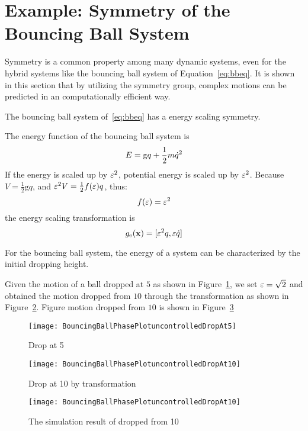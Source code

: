 \section{Example: Symmetry of the Bouncing Ball System}
\label{sec:symball}
Symmetry is a common property among many dynamic systems, even for the hybrid systems like the bouncing ball system of Equation~\ref{eq:bbeq}.
It is shown in this section that by utilizing the symmetry group, complex motions can be predicted in an computationally efficient way.

The bouncing ball system of~\ref{eq:bbeq} has a energy scaling symmetry.

The energy function of the bouncing ball system is  
\[
E=\mathrm{g}q+\frac{1}{2}m\dot{q}^2
\]
If the energy is scaled up by $\varepsilon^2$,  potential energy is scaled up by $\varepsilon^2$.
 Because $V= \frac{1}{2}\mathrm{g}q$, and $\varepsilon^2 V=\frac{1}{2}f(\varepsilon)q$, thus:
\[
f(\varepsilon)=\varepsilon^2
\]
the energy scaling transformation is
\[
g_{\mathrm{e}}(\mathbf{x})=[\varepsilon^2 q, \varepsilon \dot{q}]
\]

For the bouncing ball system, the energy of a system can be characterized by the initial dropping height.

Given the motion of a ball dropped at $5$ as shown in Figure~\ref{fig:bouncing5}, we set $\varepsilon=\sqrt{2}$ and obtained the motion dropped from $10$ through the transformation as shown in Figure~\ref{fig:bouncing10}.
Figure  motion dropped from $10$ is shown in Figure~\ref{fig:bouncing10sim}
\begin{figure}[!htbp]
  \begin{center}
      \texttt{[image: BouncingBallPhasePlotuncontrolledDropAt5]}
    \caption{Drop at 5}
    \label{fig:bouncing5}
\end{center}
\end{figure}


\begin{figure}[!htbp]
  \begin{center}
      \texttt{[image: BouncingBallPhasePlotuncontrolledDropAt10]}
    \caption{Drop at 10 by transformation}
    \label{fig:bouncing10}
\end{center}
\end{figure}

\begin{figure}[!htbp]
  \begin{center}
      \texttt{[image: BouncingBallPhasePlotuncontrolledDropAt10]}
    \caption{The simulation result of dropped from 10}
    \label{fig:bouncing10sim}
\end{center}
\end{figure}



